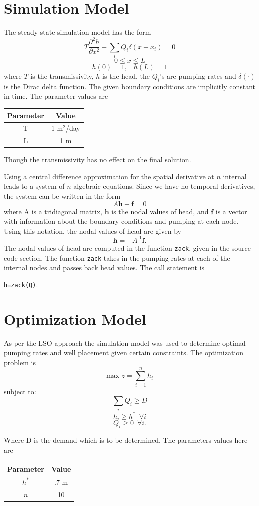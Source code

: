 \documentclass[12pt,twoside]{article}
\begin{document}
\section*{Simulation Model}
The steady state simulation model has the form 
$$
T\frac{\partial^2h}{\partial x^2}+\sum_iQ_i\delta(x-x_i)=0
$$
$$0\leq x\leq L$$
$$h(0)=1,\,\,\,\,\,h(L)=1$$
where $T$ is the transmissivity, $h$ is the head, the $Q_i$'s are pumping rates and $\delta(\cdot)$ is the Dirac delta function. The given boundary conditions are implicitly constant in time. The parameter values are
\begin{center}
\begin{tabular}{cc}
\toprule
Parameter & Value\\
\midrule
T & 1 m$^2$/day\\
L & 1 m\\
\bottomrule
\end{tabular}
\end{center}
Though the transmissivity has no effect on the final solution.

Using a central difference approximation for the spatial derivative at $n$ internal leads to a system of $n$ algebraic equations. Since we have no temporal derivatives, the system can be written in the form 
$$
A\mathbf{h}+\mathbf{f}=0
$$
where A is a tridiagonal matrix, $\mathbf{h}$ is the nodal values of head, and $\mathbf{f}$ is  a vector with information about the boundary conditions and pumping at each node.  Using this notation, the nodal values of head are given by 
$$
\mathbf{h}=-A^{\mbox{-}1}\mathbf{f}.
$$
The nodal values of head are computed in the function \verb"zack", given in the source code section.  The function \verb"zack" takes in the pumping rates at each of the internal nodes and passes back head values.  The call statement is
\begin{center}
\texttt{h=zack(Q)}.
\end{center}



\section*{Optimization Model}
As per the LSO approach the simulation model was used to determine optimal pumping rates and well placement given certain constraints.  The optimization problem is 
$$\mbox{max}\,\,z=\sum_{i=1}^nh_i$$
subject to: 
$$\sum_iQ_i\geq D $$
$$h_i \geq h^* \,\,\,\forall i $$
$$Q_i\geq 0 \,\,\, \forall i.$$

Where D is the demand which is to be determined.  The parameters values here are 
\begin{center}
\begin{tabular}{cc}
\toprule
Parameter & Value\\
\midrule
$h^*$ & .7 m\\
$n$ & 10 \\
\bottomrule
\end{tabular}
\end{center}
\end{document}
